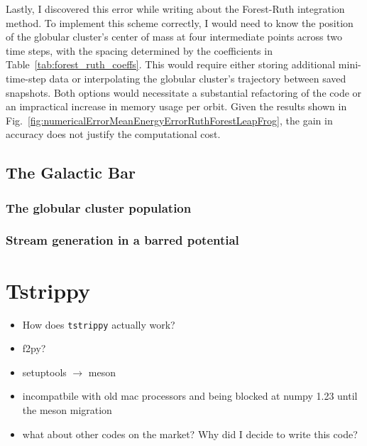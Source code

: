         Lastly, I discovered this error while writing about the Forest-Ruth integration method. To implement this scheme correctly, I would need to know the position of the globular cluster’s center of mass at four intermediate points across two time steps, with the spacing determined by the coefficients in Table~\ref{tab:forest_ruth_coeffs}. This would require either storing additional mini-time-step data or interpolating the globular cluster's trajectory between saved snapshots. Both options would necessitate a substantial refactoring of the code or an impractical increase in memory usage per orbit. Given the results shown in Fig.~\ref{fig:numericalErrorMeanEnergyErrorRuthForestLeapFrog}, the gain in accuracy does not justify the computational cost.

    \subsection{The Galactic Bar}

        \subsubsection{The globular cluster population}


        \subsubsection{Stream generation in a barred potential}


\section{Tstrippy}

    \begin{itemize}
        \item How does \texttt{tstrippy} actually work?
        \item f2py? 
        \item setuptools $\rightarrow$ meson 
        \item incompatbile with old mac processors and being blocked at numpy 1.23 until the meson migration 
        \item what about other codes on the market? Why did I decide to write this code? 
    \end{itemize}

